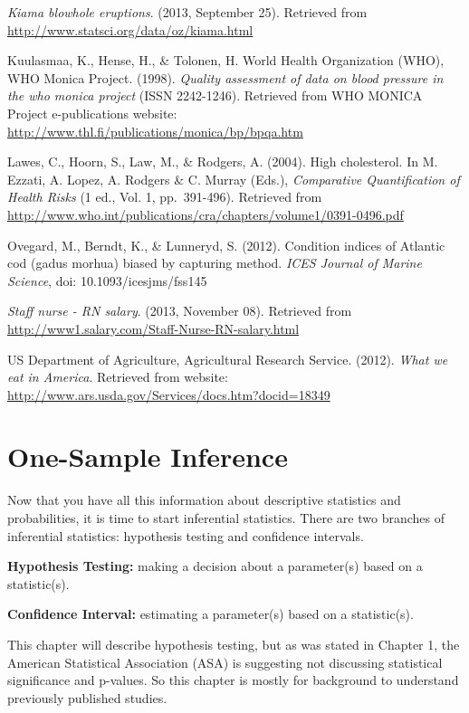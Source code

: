 \documentclass[]{book}
\begin{document}
\emph{Kiama blowhole eruptions}. (2013, September 25). Retrieved from
\url{http://www.statsci.org/data/oz/kiama.html}

Kuulasmaa, K., Hense, H., \& Tolonen, H. World Health Organization (WHO),
WHO Monica Project. (1998). \emph{Quality assessment of data on blood
pressure in the who monica project} (ISSN 2242-1246). Retrieved from WHO
MONICA Project e-publications website:
\url{http://www.thl.fi/publications/monica/bp/bpqa.htm}

Lawes, C., Hoorn, S., Law, M., \& Rodgers, A. (2004). High cholesterol.
In M. Ezzati, A. Lopez, A. Rodgers \& C. Murray (Eds.), \emph{Comparative
Quantification of Health Risks} (1 ed., Vol. 1, pp.~391-496). Retrieved
from
\url{http://www.who.int/publications/cra/chapters/volume1/0391-0496.pdf}

Ovegard, M., Berndt, K., \& Lunneryd, S. (2012). Condition indices of
Atlantic cod (gadus morhua) biased by capturing method. \emph{ICES Journal of
Marine Science}, doi: 10.1093/icesjms/fss145

\emph{Staff nurse - RN salary}. (2013, November 08). Retrieved from
\url{http://www1.salary.com/Staff-Nurse-RN-salary.html}

US Department of Agriculture, Agricultural Research Service. (2012).
\emph{What we eat in America}. Retrieved from website:
\url{http://www.ars.usda.gov/Services/docs.htm?docid=18349}

\hypertarget{one-sample-inference}{%
\chapter{One-Sample Inference}\label{one-sample-inference}}

Now that you have all this information about descriptive statistics and probabilities, it is time to start inferential statistics. There are two branches of inferential statistics: hypothesis testing and confidence intervals.

\textbf{Hypothesis Testing:} making a decision about a parameter(s) based on a statistic(s).

\textbf{Confidence Interval:} estimating a parameter(s) based on a statistic(s).

This chapter will describe hypothesis testing, but as was stated in Chapter 1, the American Statistical Association (ASA) is suggesting not discussing statistical significance and p-values. So this chapter is mostly for background to understand previously published studies.
\end{document}
